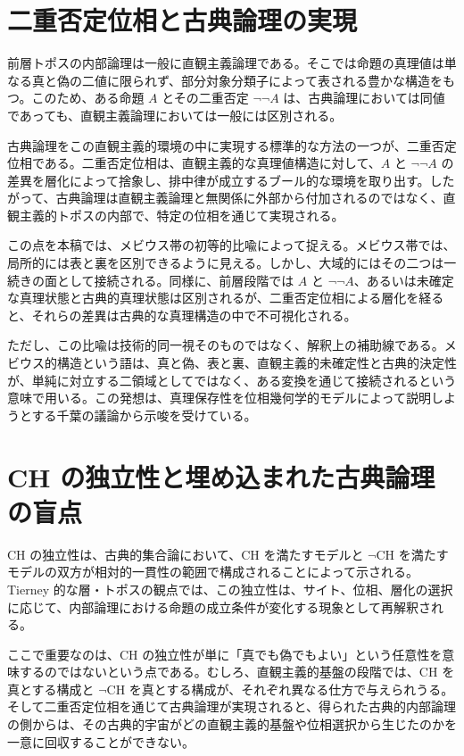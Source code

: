 \documentclass[11pt]{ltjsarticle}
\begin{document}
\section{二重否定位相と古典論理の実現}

前層トポスの内部論理は一般に直観主義論理である。そこでは命題の真理値は単なる真と偽の二値に限られず、部分対象分類子によって表される豊かな構造をもつ。このため、ある命題 $A$ とその二重否定 $\neg\neg A$ は、古典論理においては同値であっても、直観主義論理においては一般には区別される。

古典論理をこの直観主義的環境の中に実現する標準的な方法の一つが、二重否定位相である。二重否定位相は、直観主義的な真理値構造に対して、$A$ と $\neg\neg A$ の差異を層化によって捨象し、排中律が成立するブール的な環境を取り出す。したがって、古典論理は直観主義論理と無関係に外部から付加されるのではなく、直観主義的トポスの内部で、特定の位相を通じて実現される。

この点を本稿では、メビウス帯の初等的比喩によって捉える。メビウス帯では、局所的には表と裏を区別できるように見える。しかし、大域的にはその二つは一続きの面として接続される。同様に、前層段階では $A$ と $\neg\neg A$、あるいは未確定な真理状態と古典的真理状態は区別されるが、二重否定位相による層化を経ると、それらの差異は古典的な真理構造の中で不可視化される。

ただし、この比喩は技術的同一視そのものではなく、解釈上の補助線である。メビウス的構造という語は、真と偽、表と裏、直観主義的未確定性と古典的決定性が、単純に対立する二領域としてではなく、ある変換を通じて接続されるという意味で用いる。この発想は、真理保存性を位相幾何学的モデルによって説明しようとする千葉の議論から示唆を受けている\cite{chiba2026}。

\section{CH の独立性と埋め込まれた古典論理の盲点}

CH の独立性は、古典的集合論において、CH を満たすモデルと $\neg\mathrm{CH}$ を満たすモデルの双方が相対的一貫性の範囲で構成されることによって示される。Tierney 的な層・トポスの観点では、この独立性は、サイト、位相、層化の選択に応じて、内部論理における命題の成立条件が変化する現象として再解釈される。

ここで重要なのは、CH の独立性が単に「真でも偽でもよい」という任意性を意味するのではないという点である。むしろ、直観主義的基盤の段階では、CH を真とする構成と $\neg\mathrm{CH}$ を真とする構成が、それぞれ異なる仕方で与えられうる。そして二重否定位相を通じて古典論理が実現されると、得られた古典的内部論理の側からは、その古典的宇宙がどの直観主義的基盤や位相選択から生じたのかを一意に回収することができない。
\end{document}
